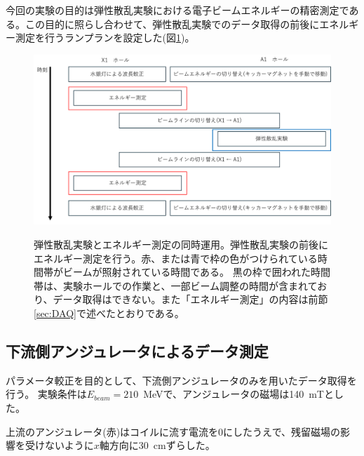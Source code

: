 \documentclass[a4paper,11pt,uplatex]{jsbook}
\begin{document}
今回の実験の目的は弾性散乱実験における電子ビームエネルギーの精密測定である。この目的に照らし合わせて、弾性散乱実験でのデータ取得の前後にエネルギー測定を行うランプランを設定した(図\ref{beamtime})。
\begin{figure}
  \centering
  \includegraphics[width=\linewidth]{image/3-beamtime.png}\\
  \caption[弾性散乱実験とエネルギー測定の同時運用]{弾性散乱実験とエネルギー測定の同時運用。弾性散乱実験の前後にエネルギー測定を行う。赤、または青で枠の色がつけられている時間帯がビームが照射されている時間である。
  黒の枠で囲われた時間帯は、実験ホールでの作業と、一部ビーム調整の時間が含まれており、データ取得はできない。また「エネルギー測定」の内容は前節\ref{sec:DAQ}で述べたとおりである。}
  \label{beamtime}
\end{figure}
\subsection{下流側アンジュレータによるデータ測定}
パラメータ較正を目的として、下流側アンジュレータのみを用いたデータ取得を行う。
実験条件は$E_{beam} = 210$~MeVで、アンジュレータの磁場は140~mTとした。

上流のアンジュレータ(赤)はコイルに流す電流を0にしたうえで、残留磁場の影響を受けないように$x$軸方向に30~cmずらした。
\end{document}
